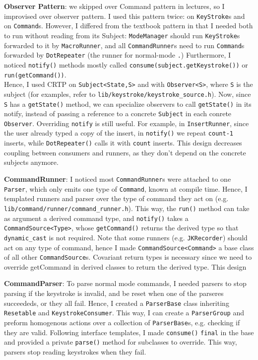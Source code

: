 \documentclass{article}
\begin{document}
\textbf{Observer Pattern}: we skipped over Command pattern in lectures, 
so I improvised over observer pattern. I used this pattern twice: 
on \texttt{KeyStroke}s and on \texttt{Command}s. 
However, I differed from the textbook pattern in that 
I needed both to run without reading from its Subject: 
\texttt{ModeManager} should run \texttt{KeyStroke}s 
forwarded to it by \texttt{MacroRunner}, 
and all \texttt{CommandRunner}s need to run 
\texttt{Command}s forwarded by \texttt{DotRepeater} 
(the runner for normal-mode \texttt{.})
Furthermore, I noticed \texttt{notify()} methods 
mostly called \texttt{consume(subject.getKeystroke())} or \texttt{run(getCommand())}. 
\\Hence, I used CRTP on \texttt{Subject<State,S>} and 
with \texttt{Observer<S>}, where \texttt{S} is the subject 
(for examples, refer to \texttt{lib/keystroke/keystroke\_source.h}). 
Now, since \texttt{S} has a \texttt{getState()} method, 
we can specialize observers to call \texttt{getState()}
in its notify, instead of passing a reference to a concrete \texttt{Subject} 
in each conrete \texttt{Observer}. Overriding \texttt{notify} is still useful. 
For example, in \texttt{InsertRunner}, since the user already typed a copy of the insert, 
in \texttt{notify()} we repeat \texttt{count-1} inserts, 
while \texttt{DotRepeater()} calls it with \texttt{count} inserts. 
This design decreases coupling between consumers and runners, as they don't depend on 
the concrete subjects anymore. 

\textbf{CommandRunner}: I noticed most \texttt{CommandRunner}s 
were attached to one \texttt{Parser}, which only emits one type of \texttt{Command}, 
known at compile time. Hence, I templated runners and parser over 
the type of command they act on (e.g. \texttt{lib/command/runner/command\_runner.h}). 
This way, the \texttt{run()} method can take as argument a derived command type, 
and \texttt{notify()} takes a \texttt{CommandSource<Type>}, whose 
\texttt{getCommand()} returns the derived type so that \texttt{dynamic\_cast} is 
not required. Note that some runners (e.g. \texttt{JKRecorder}) 
should act on any type of command, 
hence I made \texttt{CommandSource<Command>}  a base class of all other 
\texttt{CommandSource}s. Covariant return types is necessary since 
we need to override getCommand in derived classes to return the derived type. 
This design 

\textbf{CommandParser}: To parse normal mode commands, 
I needed parsers to stop parsing if the keystroke is invalid, 
and be reset when one of the parseres succeededs, or they all fail. 
Hence, I created a \texttt{ParserBase} class inheriting \texttt{Resetable} 
and \texttt{KeystrokeConsumer}. 
This way, I can create a \texttt{ParserGroup} 
and preform homogenous actions over a collection of \texttt{ParserBase}s, 
e.g. checking if they are valid. 
Following interface templates, I made \texttt{consume()} \texttt{final} in the base 
and provided a private \texttt{parse()} method for subclasses to override. 
This way, parsers stop reading keystrokes when they fail. 
\end{document}
